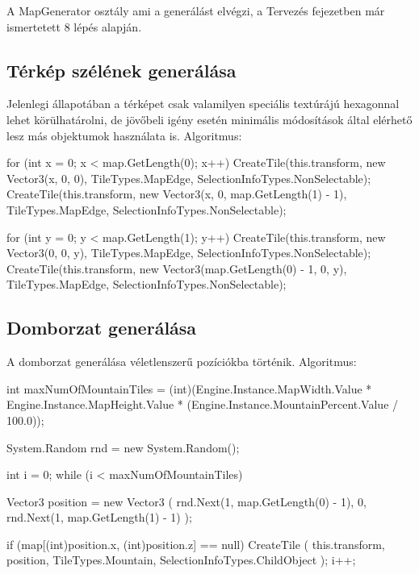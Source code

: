 \noindent A MapGenerator osztály ami a generálást elvégzi, a Tervezés fejezetben már ismertetett 8 lépés alapján.

\subsection{Térkép szélének generálása}

Jelenlegi állapotában a térképet csak valamilyen speciális textúrájú hexagonnal lehet körülhatárolni, de jövőbeli igény esetén minimális módosítások által elérhető lesz más objektumok használata is. 
\newline
\newline Algoritmus:

\begin{cpp}
for (int x = 0; x < map.GetLength(0); x++)
{
   CreateTile(this.transform, new Vector3(x, 0, 0),
   TileTypes.MapEdge, SelectionInfoTypes.NonSelectable);
   CreateTile(this.transform, new Vector3(x, 0, map.GetLength(1) - 1),
   TileTypes.MapEdge, SelectionInfoTypes.NonSelectable);
}

for (int y = 0; y < map.GetLength(1); y++)
{
   CreateTile(this.transform, new Vector3(0, 0, y),
   TileTypes.MapEdge, SelectionInfoTypes.NonSelectable);
   CreateTile(this.transform, new Vector3(map.GetLength(0) - 1, 0, y),
   TileTypes.MapEdge, SelectionInfoTypes.NonSelectable);
}
\end{cpp}

\subsection{Domborzat generálása}

A domborzat generálása véletlenszerű pozíciókba történik.
\newline
\newline Algoritmus:

\begin{cpp}
int maxNumOfMountainTiles = 
(int)(Engine.Instance.MapWidth.Value * Engine.Instance.MapHeight.Value * 
(Engine.Instance.MountainPercent.Value / 100.0));

System.Random rnd = new System.Random();

int i = 0;
while (i < maxNumOfMountainTiles)
{
   Vector3 position = new Vector3
   (
      rnd.Next(1, map.GetLength(0) - 1),
      0, rnd.Next(1, map.GetLength(1) - 1)
   );

   if (map[(int)position.x, (int)position.z] == null)
   {
      CreateTile
      (
         this.transform, position, TileTypes.Mountain, 
         SelectionInfoTypes.ChildObject
      );
      i++;
   }
}
\end{cpp}

